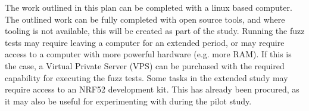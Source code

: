 \documentclass[11pt]{article}
\begin{document}

The work outlined in this plan can be completed with a linux based computer.
The outlined work can be fully completed with open source tools, and where
tooling is not available, this will be created as part of the study. Running
the fuzz tests may require leaving a computer for an extended period, or may
require access to a computer with more powerful hardware (e.g. more RAM). If
this is the case, a Virtual Private Server (VPS) can be purchased with the
required capability for executing the fuzz tests. Some tasks in the extended
study may require access to an NRF52 development kit. This has already been
procured, as it may also be useful for experimenting with during the pilot study.
\end{document}
